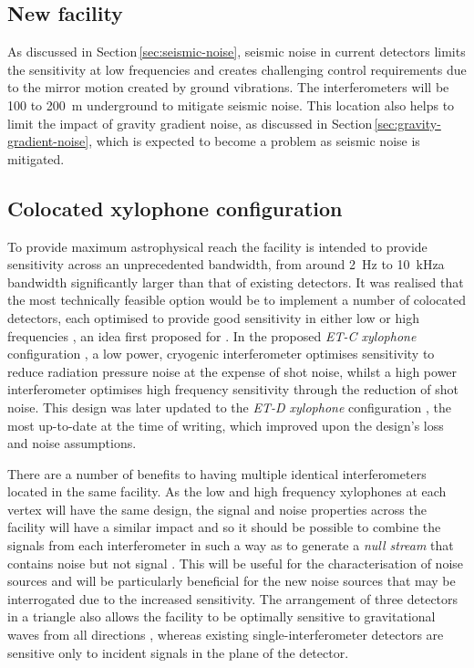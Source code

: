 \subsection{New facility}
As discussed in Section\,\ref{sec:seismic-noise}, seismic noise in current detectors limits the sensitivity at low frequencies and creates challenging control requirements due to the mirror motion created by ground vibrations. The \ET{} interferometers will be \num{100} to \SI{200}{\meter} underground to mitigate seismic noise. This location also helps to limit the impact of gravity gradient noise, as discussed in Section\,\ref{sec:gravity-gradient-noise}, which is expected to become a problem as seismic noise is mitigated.

\subsection{Colocated xylophone configuration}
To provide maximum astrophysical reach the facility is intended to provide sensitivity across an unprecedented bandwidth, from around \SI{2}{\hertz} to \SI{10}{\kilo\hertz}\textemdash a bandwidth significantly larger than that of existing detectors. It was realised that the most technically feasible option would be to implement a number of colocated detectors, each optimised to provide good sensitivity in either low or high frequencies \cite{Hild2010}, an idea first proposed for \ALIGO{} \cite{Conforto2004}. In the proposed \emph{ET-C xylophone} configuration \cite{Hild2010}, a low power, cryogenic interferometer optimises sensitivity to reduce radiation pressure noise at the expense of shot noise, whilst a high power interferometer optimises high frequency sensitivity through the reduction of shot noise. This design was later updated to the \emph{ET-D xylophone} configuration \cite{Hild2011}, the most up-to-date at the time of writing, which improved upon the design's loss and noise assumptions.

There are a number of benefits to having multiple identical interferometers located in the same facility. As the low and high frequency xylophones at each vertex will have the same design, the signal and noise properties across the facility will have a similar impact and so it should be possible to combine the signals from each interferometer in such a way as to generate a \emph{null stream} that contains noise but not signal \cite{Hewitson2005, Ajith2006}. This will be useful for the characterisation of noise sources and will be particularly beneficial for the new noise sources that may be interrogated due to the increased sensitivity. The arrangement of three detectors in a triangle also allows the facility to be optimally sensitive to gravitational waves from all directions \cite{Winkler1985}, whereas existing single-interferometer detectors are sensitive only to incident signals in the plane of the detector.

